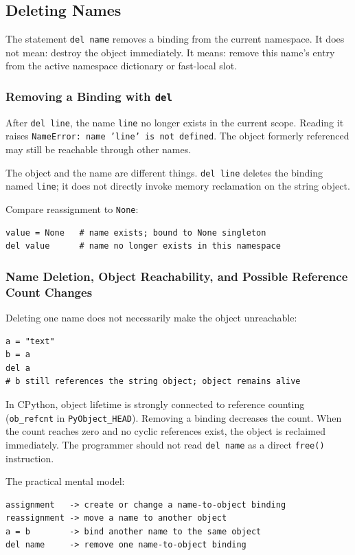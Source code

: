 \subsection{Deleting Names}

The statement \texttt{del name} removes a binding from the current namespace. It does not mean: destroy the object immediately. It means: remove this name's entry from the active namespace dictionary or fast-local slot.

\subsubsection{Removing a Binding with \texttt{del}}

After \texttt{del line}, the name \texttt{line} no longer exists in the current scope. Reading it raises \texttt{NameError: name 'line' is not defined}. The object formerly referenced may still be reachable through other names.

The object and the name are different things. \texttt{del line} deletes the binding named \texttt{line}; it does not directly invoke memory reclamation on the string object.

Compare reassignment to \texttt{None}:

\begin{verbatim}
value = None   # name exists; bound to None singleton
del value      # name no longer exists in this namespace
\end{verbatim}

\subsubsection{Name Deletion, Object Reachability, and Possible Reference Count Changes}

Deleting one name does not necessarily make the object unreachable:

\begin{verbatim}
a = "text"
b = a
del a
# b still references the string object; object remains alive
\end{verbatim}

In CPython, object lifetime is strongly connected to reference counting (\texttt{ob\_refcnt} in \texttt{PyObject\_HEAD}). Removing a binding decreases the count. When the count reaches zero and no cyclic references exist, the object is reclaimed immediately. The programmer should not read \texttt{del name} as a direct \texttt{free()} instruction.

The practical mental model:

\begin{verbatim}
assignment   -> create or change a name-to-object binding
reassignment -> move a name to another object
a = b        -> bind another name to the same object
del name     -> remove one name-to-object binding
\end{verbatim}
